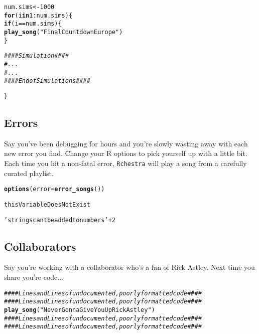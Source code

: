 \documentclass{article}\usepackage[]{graphicx}\usepackage[]{color}
\makeatletter
\newcommand{\hlnum}[1]{\textcolor[rgb]{0.686,0.059,0.569}{#1}}%
\newcommand{\hlstr}[1]{\textcolor[rgb]{0.192,0.494,0.8}{#1}}%
\newcommand{\hlcom}[1]{\textcolor[rgb]{0.678,0.584,0.686}{\textit{#1}}}%
\newcommand{\hlopt}[1]{\textcolor[rgb]{0,0,0}{#1}}%
\newcommand{\hlstd}[1]{\textcolor[rgb]{0.345,0.345,0.345}{#1}}%
\newcommand{\hlkwa}[1]{\textcolor[rgb]{0.161,0.373,0.58}{\textbf{#1}}}%
\newcommand{\hlkwb}[1]{\textcolor[rgb]{0.69,0.353,0.396}{#1}}%
\newcommand{\hlkwc}[1]{\textcolor[rgb]{0.333,0.667,0.333}{#1}}%
\newcommand{\hlkwd}[1]{\textcolor[rgb]{0.737,0.353,0.396}{\textbf{#1}}}%
\newenvironment{kframe}{%
 \def\at@end@of@kframe{}%
 \ifinner\ifhmode%
  \def\at@end@of@kframe{\end{minipage}}%
  \begin{minipage}{\columnwidth}%
 \fi\fi%
 \def\FrameCommand##1{\hskip\@totalleftmargin \hskip-\fboxsep
 \colorbox{shadecolor}{##1}\hskip-\fboxsep
     \hskip-\linewidth \hskip-\@totalleftmargin \hskip\columnwidth}%
 \MakeFramed {\advance\hsize-\width
   \@totalleftmargin\z@ \linewidth\hsize
   \@setminipage}}%
 {\par\unskip\endMakeFramed%
 \at@end@of@kframe}
\newenvironment{knitrout}{}{} %
\makeatother
\begin{document}
\begin{knitrout}
\color{fgcolor}\begin{kframe}
\begin{alltt}
\hlstd{num.sims} \hlkwb{<-} \hlnum{1000}
\hlkwa{for}\hlstd{(i} \hlkwa{in} \hlnum{1}\hlopt{:}\hlstd{num.sims)\{}
  \hlkwa{if}\hlstd{(i} \hlopt{==} \hlstd{num.sims)\{}
    \hlkwd{play_song}\hlstd{(}\hlstr{"Final Countdown Europe"}\hlstd{)}
  \hlstd{\}}

  \hlcom{#### Simulation ####}
  \hlcom{# ...}
  \hlcom{# ...}
  \hlcom{#### End of Simulations ####}

\hlstd{\}}
\end{alltt}
\end{kframe}
\end{knitrout}


\subsection{Errors}
Say you've been debugging for hours and you're slowly wasting away with each new error you find. Change your R options to pick yourself up with a little bit. Each time you hit a non-fatal error, \texttt{Rchestra} will play a song from a carefully curated playlist.

\begin{knitrout}
\color{fgcolor}\begin{kframe}
\begin{alltt}
\hlkwd{options}\hlstd{(}\hlkwc{error} \hlstd{=} \hlkwd{error_songs}\hlstd{())}

\hlstd{thisVariableDoesNotExist}

\hlstr{'strings cant be added to numbers'} \hlopt{+} \hlnum{2}
\end{alltt}
\end{kframe}
\end{knitrout}

\subsection{Collaborators}
Say you're working with a collaborator who's a fan of Rick Astley. Next time you share you're code...
\begin{knitrout}
\color{fgcolor}\begin{kframe}
\begin{alltt}
\hlcom{#### Lines and Lines of undocumented, poorly formatted code ####}
\hlcom{#### Lines and Lines of undocumented, poorly formatted code ####}
\hlkwd{play_song}\hlstd{(}\hlstr{"Never Gonna Give You Up Rick Astley"}\hlstd{)}
\hlcom{#### Lines and Lines of undocumented, poorly formatted code ####}
\hlcom{#### Lines and Lines of undocumented, poorly formatted code ####}
\end{alltt}
\end{kframe}
\end{knitrout}
\end{document}
